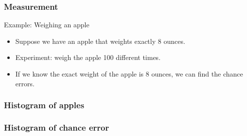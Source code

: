 \documentclass[handout]{beamer}
\begin{document}

   \begin{frame} \frametitle{Measurement}

   \begin{block}
   {Example: Weighing an apple}
   \begin{itemize}
   \item Suppose we have an apple that weights exactly 8 ounces.
   \item Experiment: weigh the apple 100 different times.
   \item If we know the exact weight of the apple is 8 ounces,
   we can find the chance errors.
   \end{itemize}
   \end{block}
   \end{frame}



   \begin{frame}
   \frametitle{Histogram of apples}
   \begin{center}
   \end{center}

   \end{frame}



   \begin{frame}
   \frametitle{Histogram of chance error}
   \begin{center}
   \end{center}

   \end{frame}
\end{document}

